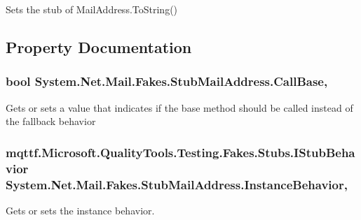 Sets the stub of Mail\-Address.\-To\-String()



\subsection{Property Documentation}
\hypertarget{class_system_1_1_net_1_1_mail_1_1_fakes_1_1_stub_mail_address_a8a4a74a2d1d4bfef39c14ab6b5fd28cd}{
\subsubsection[{Call\-Base}]{\setlength{\rightskip}{0pt plus 5cm}bool System.\-Net.\-Mail.\-Fakes.\-Stub\-Mail\-Address.\-Call\-Base\hspace{0.3cm}{\ttfamily [get]}, {\ttfamily [set]}}}\label{class_system_1_1_net_1_1_mail_1_1_fakes_1_1_stub_mail_address_a8a4a74a2d1d4bfef39c14ab6b5fd28cd}


Gets or sets a value that indicates if the base method should be called instead of the fallback behavior

\hypertarget{class_system_1_1_net_1_1_mail_1_1_fakes_1_1_stub_mail_address_a15482c970237108f39903d8917c3853b}{
\subsubsection[{Instance\-Behavior}]{\setlength{\rightskip}{0pt plus 5cm}mqttf.\-Microsoft.\-Quality\-Tools.\-Testing.\-Fakes.\-Stubs.\-I\-Stub\-Behavior System.\-Net.\-Mail.\-Fakes.\-Stub\-Mail\-Address.\-Instance\-Behavior\hspace{0.3cm}{\ttfamily [get]}, {\ttfamily [set]}}}\label{class_system_1_1_net_1_1_mail_1_1_fakes_1_1_stub_mail_address_a15482c970237108f39903d8917c3853b}


Gets or sets the instance behavior.

